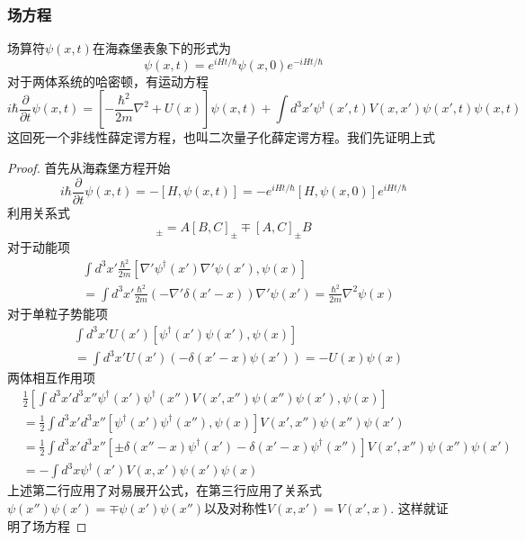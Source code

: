 \documentclass[12pt]{article}
\newtheorem{proof}{证明}[subsection]
\begin{document}
\subsubsection{场方程}
场算符$\psi(x,t)$在海森堡表象下的形式为
\begin{equation*}
    \psi(x,t)=e^{iHt/\hbar}\psi(x,0)e^{-iHt/\hbar}
\end{equation*}
对于两体系统的哈密顿，有运动方程
\begin{equation*}
    i\hbar\frac{\partial}{\partial t}\psi(x,t)=\left[-\frac{\hbar^2}{2m}\nabla^2+U(x)\right]\psi(x,t)+\int d^3x'\psi^\dagger(x',t)V(x,x')\psi(x',t)\psi(x,t)
\end{equation*}
这回死一个非线性薛定谔方程，也叫二次量子化薛定谔方程。我们先证明上式
\begin{proof}
    首先从海森堡方程开始
    \begin{equation*}
        i\hbar\frac{\partial}{\partial t}\psi(x,t)=-[H,\psi(x,t)]=-e^{iHt/\hbar}[H,\psi(x,0)]e^{iHt/\hbar}
    \end{equation*}
    利用关系式
    \begin{equation*}
        [AB,C]_{\pm}=A[B,C]_{\pm}\mp[A,C]_{\pm}B
    \end{equation*}
    对于动能项
    \begin{equation*}
        \begin{split}
            &\int d^3x'\frac{\hbar^2}{2m}[\nabla'\psi^\dagger(x')\nabla'\psi(x'),\psi(x)]\\
            &=\int d^3x'\frac{\hbar^2}{2m}(-\nabla'\delta(x'-x))\nabla'\psi(x')=\frac{\hbar^2}{2m}\nabla^2\psi(x)
        \end{split}
    \end{equation*}
    对于单粒子势能项
    \begin{equation*}
        \begin{split}
            &\int d^3x'U(x')[\psi^\dagger(x')\psi(x'),\psi(x)]\\
            &=\int d^3x'U(x')(-\delta(x'-x)\psi(x'))=-U(x)\psi(x)
        \end{split}
    \end{equation*}
    两体相互作用项
    \begin{equation*}
        \begin{split}
            &\frac{1}{2}\left[\int d^3x'd^3x''\psi^\dagger(x')\psi^\dagger(x'')V(x',x'')\psi(x'')\psi(x'),\psi(x)\right]\\
            &=\frac{1}{2}\int d^3x'd^3x''[\psi^\dagger(x')\psi^\dagger(x''),\psi(x)]V(x',x'')\psi(x'')\psi(x')\\
            &=\frac{1}{2}\int d^3x'd^3x''[\pm\delta(x''-x)\psi^\dagger(x')-\delta(x'-x)\psi^\dagger(x'')]V(x',x'')\psi(x'')\psi(x')\\
            &=-\int d^3x\psi^\dagger(x')V(x,x')\psi(x')\psi(x)
        \end{split}
    \end{equation*}
    上述第二行应用了对易展开公式，在第三行应用了关系式$\psi(x'')\psi(x')=\mp\psi(x')\psi(x'')$以及对称性$V(x,x')=V(x',x)$. 这样就证明了场方程
\end{proof}
\end{document}

